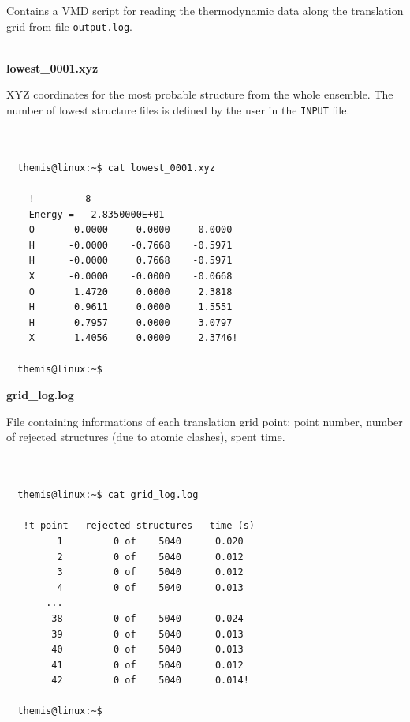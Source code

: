 \documentclass[10pt,a4paper]{report}
\begin{document}
  Contains a VMD script for reading the thermodynamic data along the translation
  grid from file \texttt{output.log}. \\~

\textbf{lowest\_0001.xyz}
  
  XYZ coordinates for the most probable structure from the whole ensemble. The
  number of lowest structure files is defined by the user in the \texttt{INPUT}
  file. \\~

\begin{center}
  \begin{minipage}{0.5\textwidth}
    \begin{verbatim}

  themis@linux:~$ cat lowest_0001.xyz

    !         8
    Energy =  -2.8350000E+01
    O       0.0000     0.0000     0.0000
    H      -0.0000    -0.7668    -0.5971
    H      -0.0000     0.7668    -0.5971
    X      -0.0000    -0.0000    -0.0668
    O       1.4720     0.0000     2.3818
    H       0.9611     0.0000     1.5551
    H       0.7957     0.0000     3.0797
    X       1.4056     0.0000     2.3746!

  themis@linux:~$ 

    \end{verbatim}
    \vskip0.25cm
  \end{minipage}%
\end{center}


\textbf{grid\_log.log}

  File containing informations of each translation grid point: point number,
  number of rejected structures (due to atomic clashes), spent time. \\~

\begin{center}
  \begin{minipage}{0.40\textwidth}
    \begin{verbatim}

  themis@linux:~$ cat grid_log.log

   !t point   rejected structures   time (s)
         1         0 of    5040      0.020
         2         0 of    5040      0.012
         3         0 of    5040      0.012
         4         0 of    5040      0.013
       ...
        38         0 of    5040      0.024
        39         0 of    5040      0.013
        40         0 of    5040      0.013
        41         0 of    5040      0.012
        42         0 of    5040      0.014!

  themis@linux:~$ 

    \end{verbatim}
    \vskip0.25cm
  \end{minipage}%
\end{center}
\end{document}
